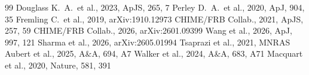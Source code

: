 \begin{thebibliography}{99}
 Douglass K.~A.\ et al., 2023, ApJS, 265, 7
 Perley D.~A.\ et al., 2020, ApJ, 904, 35
 Fremling C.\ et al., 2019, arXiv:1910.12973
 CHIME/FRB Collab., 2021, ApJS, 257, 59
 CHIME/FRB Collab., 2026, arXiv:2601.09399
 Wang et al., 2026, ApJ, 997, 121
 Sharma et al., 2026, arXiv:2605.01994
 Tsaprazi et al., 2021, MNRAS
 Aubert et al., 2025, A\&A, 694, A7
 Walker et al., 2024, A\&A, 683, A71
 Macquart et al., 2020, Nature, 581, 391
\end{thebibliography}
